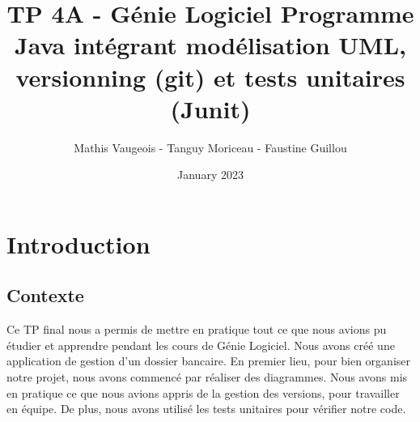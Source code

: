 \documentclass{article}
\title{TP 4A - Génie Logiciel
Programme Java intégrant modélisation UML, versionning (git)
et tests unitaires (Junit)
}
\author{Mathis Vaugeois - Tanguy Moriceau -  Faustine Guillou}
\date{January 2023}
\begin{document}
\maketitle
\tableofcontents

\newpage
\section{Introduction}
\newline
\subsection{Contexte}
Ce TP final nous a permis de mettre en pratique tout ce que nous avions pu étudier et apprendre pendant les cours de Génie Logiciel.
Nous avons créé une application de gestion d'un dossier bancaire. En premier lieu, pour bien organiser notre projet, nous avons commencé par réaliser des diagrammes. Nous avons mis en pratique ce que nous avions appris de la gestion des versions, pour travailler en équipe. De plus, nous avons utilisé les tests unitaires pour vérifier notre code.
\end{document}
